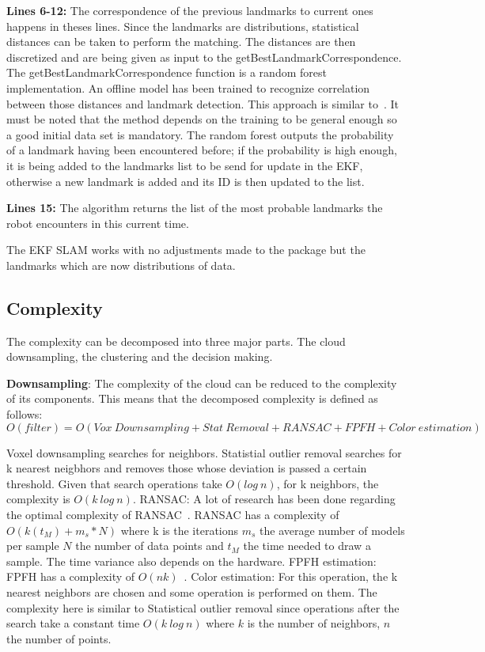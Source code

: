 \documentclass[twoside,hidelinks]{article}
\begin{document}
\textbf{Lines 6-12:} The correspondence of the previous landmarks to current ones happens in theses lines. Since the landmarks are distributions, statistical distances can be taken to perform the matching. The distances are then discretized and are being given as input to the getBestLandmarkCorrespondence. The getBestLandmarkCorrespondence function is a random forest implementation. An offline model has been trained to recognize correlation between those distances and landmark detection. This approach is similar to~\cite{objectDisc}. It must be noted that the method depends on the training to be general enough so a good initial data set is mandatory. The random forest outputs the probability of a landmark having been encountered before; if the probability is high enough, it is being added to the landmarks list to be send for update in the EKF, otherwise a new landmark is added and its ID is then updated to the list.

\textbf{Lines 15:} The algorithm returns the list of the most probable landmarks the robot encounters in this current time.


The EKF SLAM works with no adjustments made to the package but the landmarks which are now distributions of data.

\subsection{Complexity}

The complexity can be decomposed into three major parts. The cloud downsampling, the clustering and the decision making.

\textbf{Downsampling}: The complexity of the cloud can be reduced to the complexity of its components. This means that the decomposed complexity is defined as follows:
$$O(filter) = O(Vox\ Downsampling + Stat\ Removal + RANSAC+ FPFH + Color\ estimation) $$

Voxel downsampling searches for neighbors.
Statistial outlier removal searches for k nearest neigbhors and removes those whose deviation is passed a certain threshold. Given that search operations take $O(log\ n)$, for k neighbors, the complexity is $O(k\ log\ n)$.
RANSAC: A lot of research has been done regarding the optimal complexity of RANSAC~\cite{RANSAC}. RANSAC has a complexity of $ O(k(t_M)+ m_s*N)$ where k is the iterations $m_s$ the average number of models per sample $N$ the number of data points and $t_M$ the time needed to draw a sample. The time variance also depends on the hardware.
FPFH estimation: FPFH has a complexity of $O(nk)$~\cite{fpfh}.
Color estimation: For this operation, the k nearest neighbors are chosen and some operation is performed on them. The complexity here is similar to Statistical outlier removal since operations after the search take a constant time $O(k\ log\ n)$ where $k$ is the number of neighbors, $n$ the number of points. 
\end{document}
